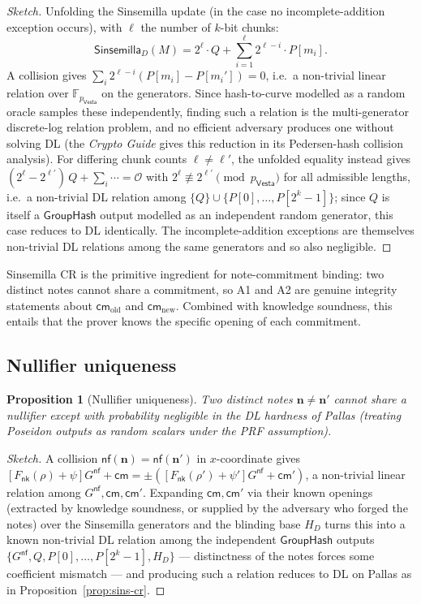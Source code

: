 \documentclass[11pt,a4paper]{article}
\newtheorem{proposition}[theorem]{Proposition}
\theoremstyle{definition}
\newcommand{\F}{\mathbb{F}}
\newcommand{\nfsym}{\mathsf{nf}}
\newcommand{\cmsym}{\mathsf{cm}}
\newcommand{\Vesta}{\ensuremath{\mathsf{Vesta}}}
\newcommand{\Sinsemilla}{\ensuremath{\mathsf{Sinsemilla}}}
\newcommand{\GroupHash}{\ensuremath{\mathsf{GroupHash}}}
\newcommand{\nksym}{\ensuremath{\mathsf{nk}}}
\begin{document}
\begin{proof}[Sketch]
Unfolding the Sinsemilla update (in the case no incomplete-addition
exception occurs), with $\ell$ the number of $k$-bit chunks:
\[
\Sinsemilla_D(M) = 2^\ell \cdot Q + \sum_{i=1}^{\ell} 2^{\ell - i} \cdot P[m_i].
\]
A collision gives $\sum_i 2^{\ell-i}(P[m_i] - P[m_i']) = 0$, i.e.\ a
non-trivial linear relation over $\F_{p_{\Vesta}}$ on the generators. Since
hash-to-curve modelled as a random oracle samples these independently,
finding such a relation is the multi-generator discrete-log relation
problem, and no efficient adversary produces one without solving DL (the
\emph{Crypto Guide} gives this reduction in its Pedersen-hash collision
analysis). For differing chunk counts $\ell \ne \ell'$, the unfolded
equality instead gives $(2^{\ell} - 2^{\ell'})\,Q + \sum_i \cdots =
\mathcal{O}$ with $2^{\ell} \not\equiv 2^{\ell'} \pmod{p_{\Vesta}}$ for all
admissible lengths, i.e.\ a non-trivial DL relation among $\{Q\} \cup
\{P[0], \dots, P[2^k - 1]\}$; since $Q$ is itself a $\GroupHash$ output
modelled as an independent random generator, this case reduces to DL
identically. The incomplete-addition exceptions are themselves
non-trivial DL relations among the same generators and so also
negligible.
\end{proof}

Sinsemilla CR is the primitive ingredient for note-commitment binding:
two distinct notes cannot share a commitment, so A1 and A2 are
genuine integrity statements about $\cmsym_{\mathrm{old}}$ and
$\cmsym_{\mathrm{new}}$. Combined with knowledge soundness, this entails
that the prover knows the specific opening of each commitment.

\subsection{Nullifier uniqueness}\label{sec:nf-unique}

\begin{proposition}[Nullifier uniqueness]\label{prop:nf-unique}
Two distinct notes $\mathbf{n} \ne \mathbf{n}'$ cannot share a nullifier
except with probability negligible in the DL hardness of Pallas (treating
Poseidon outputs as random scalars under the PRF assumption).
\end{proposition}

\begin{proof}[Sketch]
A collision $\nfsym(\mathbf{n}) = \nfsym(\mathbf{n}')$ in $x$-coordinate
gives
$[F_{\nksym}(\rho) + \psi] G^{\mathsf{nf}} + \cmsym = \pm([F_{\nksym}(\rho') + \psi'] G^{\mathsf{nf}} + \cmsym')$,
a non-trivial linear relation among $G^{\mathsf{nf}}, \cmsym, \cmsym'$.
Expanding $\cmsym, \cmsym'$ via their known openings (extracted by
knowledge soundness, or supplied by the adversary who forged the notes)
over the Sinsemilla generators and the blinding base $H_D$ turns this into
a known non-trivial DL relation among the independent $\GroupHash$ outputs
$\{G^{\mathsf{nf}}, Q, P[0], \dots, P[2^k - 1], H_D\}$ --- distinctness of
the notes forces some coefficient mismatch --- and producing such a
relation reduces to DL on Pallas as in Proposition~\ref{prop:sins-cr}.
\end{proof}
\end{document}
